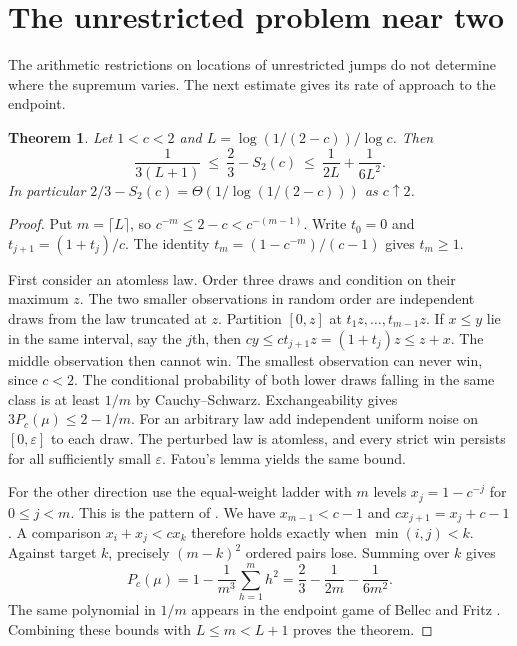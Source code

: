 \documentclass[11pt]{article}
\newtheorem{theorem}{Theorem}
\begin{document}
\section{The unrestricted problem near two}
The arithmetic restrictions on locations of unrestricted jumps
\cite{wp} do not determine where the supremum varies. The next estimate
gives its rate of approach to the endpoint.
\begin{theorem}\label{th:end}
Let $1<c<2$ and $L=\log(1/(2-c))/\log c$. Then
\[
 \frac{1}{3(L+1)}
 \ \le\ \frac23-S_2(c)
 \ \le\ \frac{1}{2L}+\frac{1}{6L^2}.
\]
In particular $2/3-S_2(c)=\Theta(1/\log(1/(2-c)))$ as $c\uparrow2$.
\end{theorem}
\begin{proof}
Put $m=\lceil L\rceil$, so $c^{-m}\le2-c<c^{-(m-1)}$. Write
$t_0=0$ and $t_{j+1}=(1+t_j)/c$. The identity
$t_m=(1-c^{-m})/(c-1)$ gives $t_m\ge1$.

First consider an atomless law. Order three draws and condition on their
maximum $z$. The two smaller observations in random order are
independent draws from the law truncated at $z$.
Partition $[0,z]$ at $t_1z,\ldots,t_{m-1}z$. If $x\le y$ lie in
the same interval, say the $j$th, then
$c y\le c t_{j+1}z=(1+t_j)z\le z+x$. The middle observation then
cannot win. The smallest observation can never win, since $c<2$.
The conditional probability of both lower draws falling in the same
class is at least $1/m$ by Cauchy--Schwarz. Exchangeability gives
$3P_c(\mu)\le 2-1/m$. For an arbitrary law add independent uniform
noise on $[0,\varepsilon]$ to each draw. The perturbed law is atomless,
and every strict win persists for all sufficiently small
$\varepsilon$. Fatou's lemma yields the same bound.

For the other direction use the equal-weight ladder with $m$ levels
$x_j=1-c^{-j}$ for $0\le j<m$. This is the pattern of
\cite[\S6.1.7]{zb}. We have $x_{m-1}<c-1$ and
$cx_{j+1}=x_j+c-1$. A comparison $x_i+x_j<cx_k$ therefore holds
exactly when $\min(i,j)<k$. Against target $k$, precisely $(m-k)^2$
ordered pairs lose. Summing over $k$ gives
\[
 P_c(\mu)=1-\frac{1}{m^3}\sum_{h=1}^m h^2
          =\frac23-\frac{1}{2m}-\frac{1}{6m^2}.
\]
The same polynomial in $1/m$ appears in the endpoint game of
Bellec and Fritz \cite[Theorem~1.5]{bf}. Combining these bounds with
$L\le m<L+1$ proves the theorem.
\end{proof}
\end{document}

